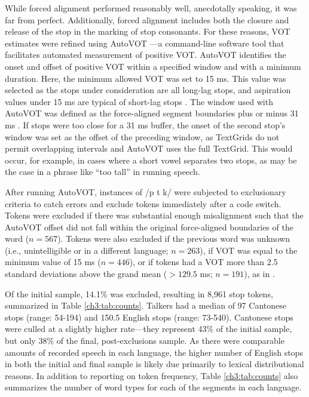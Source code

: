 While forced alignment performed reasonably well, anecdotally speaking, it was far from perfect. Additionally, forced alignment includes both the closure and release of the stop in the marking of stop consonants. For these reasons, VOT estimates were refined using AutoVOT \citep{keshet_2014_autovot}---a command-line software tool that facilitates automated measurement of positive VOT. AutoVOT identifies the onset and offset of positive VOT within a specified window and with a minimum duration. Here, the minimum allowed VOT was set to 15 ms. This value was selected as the stops under consideration are all long-lag stops, and aspiration values under 15 ms are typical of short-lag stops \citep{lieberman_1988_speech}. The window used with AutoVOT was defined as the force-aligned segment boundaries plus or minus 31 ms \citep[as recommended by][]{chodroff_2017_structure}. If stops were too close for a 31 ms buffer, the onset of the second stop's window was set as the offset of the preceding window, as TextGrids do not permit overlapping intervals and AutoVOT uses the full TextGrid. This would occur, for example, in cases where a short vowel separates two stops, as may be the case in a phrase like ``too tall'' in running speech.

After running AutoVOT, instances of /p t k/ were subjected to exclusionary criteria to catch errors and exclude tokens immediately after a code switch. Tokens were excluded if there was substantial enough misalignment such that the AutoVOT offset did not fall within the original force-aligned boundaries of the word ($n=567$). Tokens were also excluded if the previous word was unknown (i.e., unintelligible or in a different language; $n=263$), if VOT was equal to the minimum value of 15 ms ($n=446$), or if tokens had a VOT more than 2.5 standard deviations above the grand mean ($>129.5$ ms; $n=191$), as in \citet{chodroff_2017_structure}.

Of the initial sample, 14.1\% was excluded, resulting in 8,961 stop tokens, summarized in Table \ref{ch3:tab:counts}. Talkers had a median of 97 Cantonese stops (range: 54-194) and 150.5 English stops (range: 73-540). Cantonese stops were culled at a slightly higher rate---they represent 43\% of the initial sample, but only 38\% of the final, post-exclusions sample. As there were comparable amounts of recorded speech in each language, the higher number of English stops in both the initial and final sample is likely due primarily to lexical distributional reasons. In addition to reporting on token frequency, Table \ref{ch3:tab:counts} also summarizes the number of word types for each of the segments in each language. 

